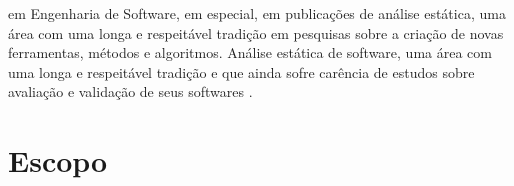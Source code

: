 em Engenharia de Software, em especial, em
publicações de análise estática, uma área com uma longa e respeitável tradição
em pesquisas sobre a criação de novas ferramentas, métodos e algoritmos.
Análise estática de software, uma área com uma longa e respeitável tradição e
que ainda sofre carência de estudos sobre avaliação e validação de seus
softwares \cite{li2010comparative, ilyas2016static}.



\section{Escopo}


